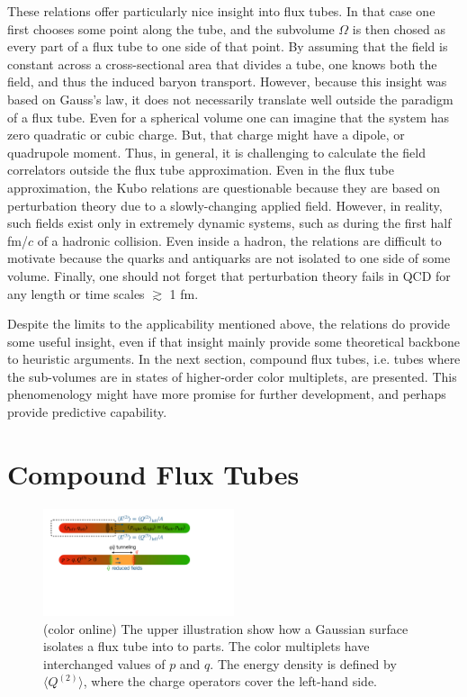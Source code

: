 \documentclass[aps, prc, 12pt, nofootinbib, showpacs, superscriptaddress, tightenlines, groupedaddress]{revtex4-2}
\begin{document}
These relations offer particularly nice insight into flux tubes. In that case one first chooses some point along the tube, and the subvolume $\Omega$ is then chosed as every part of a flux tube to one side of that point. By assuming that the field is constant across a cross-sectional area that divides a tube, one knows both the field, and thus the induced baryon transport. However, because this insight was based on Gauss's law, it does not necessarily translate well outside the paradigm of a flux tube. Even for a spherical volume one can imagine that the system has zero quadratic or cubic charge. But, that charge might have a dipole, or quadrupole moment. Thus, in general, it is challenging to calculate the field correlators outside the flux tube approximation. Even in the flux tube approximation, the Kubo relations are questionable because they are based on perturbation theory due to a slowly-changing applied field. However, in reality, such fields exist only in extremely dynamic systems, such as during the first half fm/$c$ of a hadronic collision. Even inside a hadron, the relations are difficult to motivate because the quarks and antiquarks are not isolated to one side of some volume. Finally, one should not forget that perturbation theory fails in QCD for any length or time scales $\gtrsim$ 1 fm.

Despite the limits to the applicability mentioned above, the relations do provide some useful insight, even if that insight mainly provide some theoretical backbone to heuristic arguments. In the next section, compound flux tubes, i.e. tubes where the sub-volumes are in states of higher-order color multiplets, are presented. This phenomenology might have more promise for further development, and perhaps provide predictive capability.

\section{Compound Flux Tubes}\label{sec:compound}
\begin{figure}
\centerline{\includegraphics[width=0.5\textwidth]{figs/compoundtube.pdf}}
\caption{\label{fig:compoundtube}(color online)
The upper illustration show how a Gaussian surface isolates a flux tube into to parts. The color multiplets have interchanged values of $p$ and $q$. The energy density is defined by $\langle Q^{(2)}\rangle$, where the charge operators cover the left-hand side. 
}
\end{figure}
\end{document}
